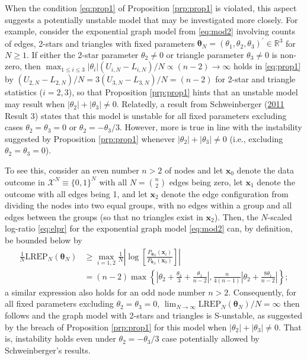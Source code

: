 \documentclass[12pt]{article}
\theoremstyle{definition}
\newcommand{\REP}{\mathrm{LREP}}
\begin{document}
When the condition \eqref{eq:prop1} of Proposition \ref{prp:prop1} is
violated, this aspect suggests a potentially unstable model that may be
investigated more closely. For example, consider the exponential graph
model from \eqref{eq:mod2} involving counts of edges, 2-stars and
triangles with fixed parameters
\(\boldsymbol \theta_N = (\theta_{1},\theta_2,\theta_3)^\prime \in \mathbb{R}^3\)
for \(N\geq 1\). If either the 2-star parameter \(\theta_2 \neq 0\) or
triangle parameter \(\theta_3 \neq 0\) is non-zero, then
\(\max_{1 \leq i \leq 3 } |\theta_{i}|(U_{i,N}-L_{i,N})/N \propto (n-2)\to \infty\)
holds in \eqref{eq:prop1} by
\((U_{2,N}-L_{2,N})/N = 3 (U_{3,N}-L_{3,N})/N=(n-2)\) for 2-star and
triangle statistics (\(i=2,3\)), so that Proposition \ref{prp:prop1}
hints that an unstable model may result when
\(|\theta_2| + |\theta_3| \neq 0\). Relatedly, a result from
Schweinberger
(\protect\hyperlink{ref-schweinberger2011instability}{2011} Result 3)
states that this model is unstable for all fixed parameters excluding
cases \(\theta_2 =\theta_3=0\) or \(\theta_2 = - \theta_3/3\). However,
more is true in line with the instability suggested by Proposition
\ref{prp:prop1} whenever \(|\theta_2| + |\theta_3| \neq 0\) (i.e.,
excluding \(\theta_2 =\theta_3=0\)).

To see this, consider an even number \(n>2\) of nodes and let
\(\boldsymbol x_0\) denote the data outcome in
\(\mathcal{X}^N \equiv \{0,1\}^N\) with all \(N = {n \choose 2}\) edges
being zero, let \(\boldsymbol x_1\) denote the outcome with all edges
being 1, and let \(\boldsymbol x_2\) denote the edge configuration from
dividing the nodes into two equal groups, with no edges within a group
and all edges between the groups (so that no triangles exist in
\(\boldsymbol x_2\)). Then, the \(N\)-scaled log-ratio \eqref{eq:elpr} for
the exponential graph model \eqref{eq:mod2} can, by definition, be bounded
below by
\begin{align*}
\frac{1}{N}\REP_N(\boldsymbol \theta_N) &\geq \max_{i=1,2}\frac{1}{N}
\left| \log\left[ \frac{P_{\boldsymbol \theta_N}(\boldsymbol x_i)}{P_{\boldsymbol \theta_N}(\boldsymbol x_0)}\right] \right| \\
&= (n-2) \max\left\{ \left| \theta_2 + \frac{\theta_3}{3}+\frac{\theta_1}{n-2} \right|, \frac{n}{4(n-1)} \left| \theta_2 + \frac{8\theta_1}{n-2} \right| \right\};
\end{align*}
a similar expression also holds for an odd node number \(n>2\).
Consequently, for all fixed parameters excluding
\(\theta_2=\theta_3=0\),
\(\lim_{N\to \infty}\REP_N(\boldsymbol \theta_N)/N=\infty\) then follows
and the graph model with 2-stars and triangles is S-unstable, as
suggested by the breach of Proposition \ref{prp:prop1} for this model
when \(|\theta_2|+|\theta_3|\neq 0\). That is, instability holds even
under \(\theta_2 = - \theta_3/3\) case potentially allowed by
Schweinberger's results.
\end{document}
